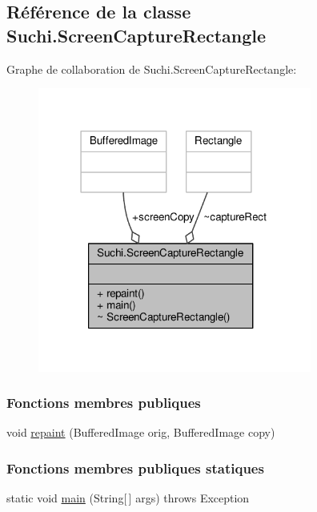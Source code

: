 \hypertarget{classSuchi_1_1ScreenCaptureRectangle}{}\subsection{Référence de la classe Suchi.\+Screen\+Capture\+Rectangle}
\label{classSuchi_1_1ScreenCaptureRectangle}


Graphe de collaboration de Suchi.\+Screen\+Capture\+Rectangle\+:\nopagebreak
\begin{figure}[H]
\begin{center}
\leavevmode
\includegraphics[width=255pt]{classSuchi_1_1ScreenCaptureRectangle__coll__graph}
\end{center}
\end{figure}
\subsubsection*{Fonctions membres publiques}
\begin{DoxyCompactItemize}
\item 
void \hyperlink{classSuchi_1_1ScreenCaptureRectangle_a50ae1df0eb3036ffa0fce3c8149eea9d}{repaint} (Buffered\+Image orig, Buffered\+Image copy)
\end{DoxyCompactItemize}
\subsubsection*{Fonctions membres publiques statiques}
\begin{DoxyCompactItemize}
\item 
static void \hyperlink{classSuchi_1_1ScreenCaptureRectangle_a8ec66707099bed4d6b617f952dda319c}{main} (String\mbox{[}$\,$\mbox{]} args)  throws Exception 
\end{DoxyCompactItemize}
